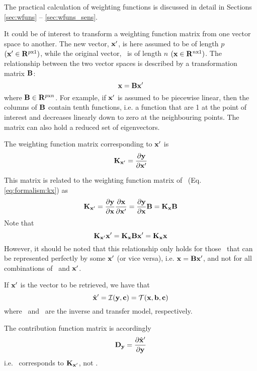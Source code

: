  The practical calculation of weighting functions is discussed in
 detail in Sections \ref{sec:wfuns} -- \ref{sec:wfuns_sens}.


 
  It could be of interest to transform a weighting function matrix from
  one vector space to another. The new vector, $\mathbf{x}'$, is here
  assumed to be of length $p$ $(\mathbf{x}' \in {\bf R}^{p {\mathrm x} 1})$, while the original
  vector, \xt\ is of length $n$ $(\mathbf{x} \in {\bf R}^{n {\mathrm x} 1})$.  The
  relationship between the two vector spaces is described by a
  transformation matrix $\mathbf{B}$:
  \begin{equation}
    \mathbf{x} = \mathbf{B}\mathbf{x}'
  \end{equation}
  where $\mathbf{B} \in {\bf R}^{p {\mathrm x} n}$. For example, if $\mathbf{x}'$ is assumed to be
  piecewise linear, then the columns of $\mathbf{B}$ contain tenth functions,
  i.e. a function that are 1 at the point of interest and decreases
  linearly down to zero at the neighbouring points.  The matrix can
  also hold a reduced set of eigenvectors.
    
  The weighting function matrix corresponding to $\mathbf{x}'$ is
  \begin{equation}
    \mathbf{K}_{\mathbf{x}'} = \frac{\partial \mathbf{y}}{\partial \mathbf{x}'}
  \end{equation}
  
  This matrix is related to the weighting function matrix of \xt\ (Eq.
  \ref{eq:formalism:kx}) as
  \begin{equation}
    \mathbf{K}_{\mathbf{x}'}
      = \frac{\partial \mathbf{y}}{\partial \mathbf{x}} \frac{\partial \mathbf{x}}{\partial \mathbf{x}'}
      = \frac{\partial \mathbf{y}}{\partial \mathbf{x}} \mathbf{B} 
      = \mathbf{K_x} \mathbf{B}
  \end{equation}
  Note that
  \begin{equation}
    \mathbf{K}_{\mathbf{x}'}\mathbf{x}' = \mathbf{K_x}\mathbf{B}\mathbf{x}' =  \mathbf{K_x}\mathbf{x}
  \end{equation}
  However, it should be noted that this relationship only holds for
  those \xt\ that can be represented perfectly by some $\mathbf{x}'$ (or vice
  versa), i.e.  $\mathbf{x}=\mathbf{B}\mathbf{x}'$, and not for all combinations of \xt\ and $\mathbf{x}'$.

  If $\mathbf{x}'$ is the vector to be retrieved, we have that \citep{rodgers:90}
  \begin{equation}
    \hat{\mathbf{x}}' = \mathcal{I}(\mathbf{y},\mathbf{c}) = \mathcal{T}(\mathbf{x},\mathbf{b},\mathbf{c})
  \end{equation}
  where \im\ and \tm\ are the inverse and transfer model, respectively.

  The contribution function matrix is accordingly
  \begin{equation}
    \mathbf{D_y} =  \frac{\partial \hat{\mathbf{x}}'}{\partial \mathbf{y}}
  \end{equation}
  i.e. \Dy\ corresponds to $\mathbf{K}_{\mathbf{x}'}$, not \Kx.
  
